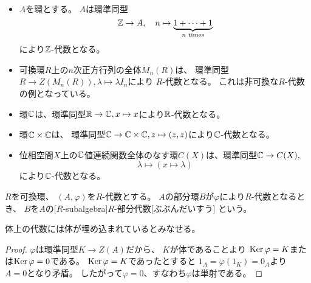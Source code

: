 \documentclass[report]{jlreq}
\begin{document}
\begin{example}[代数の例]
    ~
    \begin{itemize}
        \item $A$を環とする。
            $A$は環準同型
            \begin{equation}
                \mathbb{Z} \to A,
                \quad
                n \mapsto \underbrace{1 + \cdots + 1}_{n \text{ times}}
            \end{equation}
            により$\mathbb{Z}$-代数となる。
        \item 可換環$R$上の$n$次正方行列の全体$M_n(R)$は、
            環準同型$R \to Z(M_n(R)),\lambda \mapsto \lambda I_n$により
            $R$-代数となる。
            これは非可換な$R$-代数の例となっている。
        \item 環$\mathbb{C}$は、環準同型$\mathbb{R} \to \mathbb{C}, x \mapsto x$により$\mathbb{R}$-代数となる。
        \item 環$\mathbb{C} \times \mathbb{C}$は、
            環準同型$\mathbb{C} \to \mathbb{C} \times \mathbb{C}, z \mapsto (z, z)$により$\mathbb{C}$-代数となる。
        \item 位相空間$X$上の$\mathbb{C}$値連続関数全体のなす環$C(X)$は、環準同型$\mathbb{C} \to C(X),$
            \begin{equation}
                \lambda \mapsto (x \mapsto \lambda)
            \end{equation}
            により$\mathbb{C}$-代数となる。
    \end{itemize}
\end{example}

\begin{definition}[$R$-部分代数]
    $R$を可換環、
    $(A, \varphi)$を$R$-代数とする。
    $A$の部分環$B$が$\varphi$により$R$-代数となるとき、
    $B$を$A$の[$R$-subalgebra]{$R$-部分代数}[ぶぶんだいすう]
    という。
\end{definition}

体上の代数には体が埋め込まれているとみなせる。


\begin{proof}
    $\varphi$は環準同型$K \to Z(A)$だから、
    $K$が体であることより
    $\operatorname{\mathrm{Ker}} \varphi = K$または$\operatorname{\mathrm{Ker}} \varphi = 0$である。
    $\operatorname{\mathrm{Ker}} \varphi = K$であったとすると
    $1_A = \varphi(1_K) = 0_A$より
    $A = 0$となり矛盾。
    したがって$\varphi = 0$、すなわち$\varphi$は単射である。
\end{proof}
\end{document}
